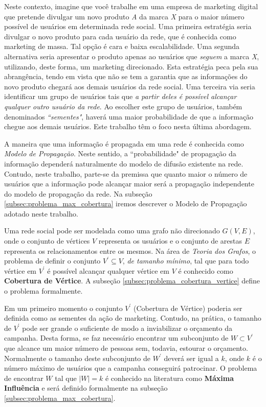 \documentclass[12pt]{article}
\begin{document}
Neste contexto, imagine que você trabalhe em uma empresa de marketing digital que pretende divulgar um novo produto \emph{A} da marca \emph{X} para o maior número possível de usuários em determinada rede social. Uma primeira estratégia seria divulgar o novo produto para cada usuário da rede, que é conhecida como marketing de massa. Tal opção é cara e baixa escalabilidade. Uma segunda alternativa seria apresentar o produto apenas ao usuários que \textit{seguem} a marca \textit{X}, utilizando, deste forma, um marketing direcionado. Esta estratégia peca pela sua abrangência, tendo em vista que não se tem a garantia que as informações do novo produto chegará aos demais usuários da rede social. Uma terceira via seria identificar um grupo de usuários tais que \textit{a partir deles é possível alcançar qualquer outro usuário da rede}{}. Ao escolher este grupo de usuários, também denominados \textit{``sementes"}, haverá uma maior probabilidade de que a informação chegue aos demais usuários. Este trabalho têm o foco nesta última abordagem.

A maneira que uma informação é propagada em uma rede é conhecida como \textit{Modelo de Propagação}. Neste sentido, a ``probabilidade" de propagação da informação dependerá naturalmente do modelo de difusão existente na rede. Contudo, neste trabalho,  parte-se da premissa que quanto maior o número de usuários que a informação pode alcançar maior será a propagação independente do modelo de propagação da rede. Na subseção \ref{subsec:problema_max_cobertura} iremos descrever o Modelo de Propagação adotado neste trabalho.

Uma rede social pode ser modelada como uma grafo não direcionado $G(V,E)${}, onde o conjunto de vértices $V$ representa os usuários e o conjunto de arestas $E$ representa os relacionamentos entre os mesmos. Na área de \textit{Teoria dos Grafos}, o problema de definir o conjunto $V^{'} \subseteq V${}, \textit{de tamanho mínimo}, tal que para todo vértice em $V^{'}$ é possível alcançar qualquer vértice em $V$ é conhecido como \textbf{Cobertura de Vértice}{}. A subseção \ref{subsec:problema_cobertura_vertice}{} define o problema formalmente.

Em um primeiro momento o conjunto $V^{'}$ (Cobertura de Vértice) poderia ser definida como as sementes da ação de marketing. Contudo, na prática, o tamanho de $V^{'}$ pode ser grande o suficiente de modo a inviabilizar o orçamento da campanha. Desta forma, se faz necessário encontrar um subconjunto de $W \subset V^{'}${} que alcance um maior número de pessoas sem, todavia, estourar o orçamento. Normalmente o tamanho deste subconjunto de $W^{'}$ deverá ser igual a $k$, onde $k$ é o número máximo de usuários que a campanha conseguirá patrocinar. O problema de encontrar $W$ tal que $|W| = k$ é conhecido na literatura como \textbf{Máxima Influência}{} e será definido formalmente na subseção \ref{subsec:problema_max_cobertura}{}.
\end{document}
